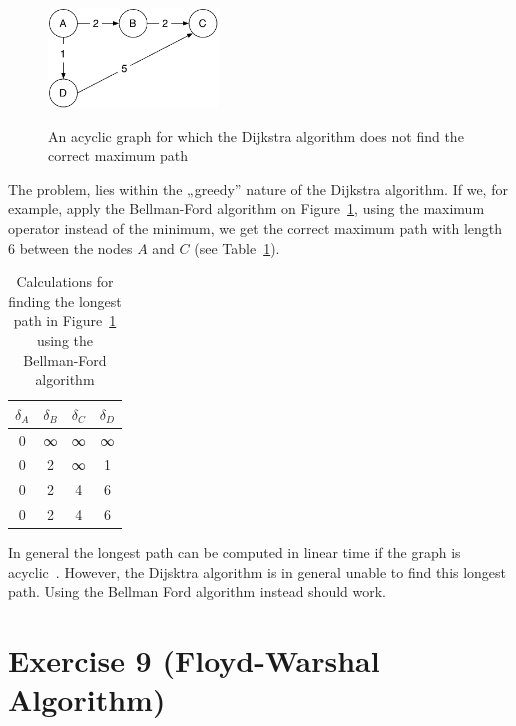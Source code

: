 \documentclass[a4paper, 12pt]{article}
\begin{document}
\begin{figure}[htbp]
    \caption{
        An acyclic graph for which the Dijkstra algorithm does not find the
        correct maximum path
    }
    \vskip 0.2cm
    \centering
    \includegraphics[width=0.4\textwidth]{Figures/Dijkstra_Counter_Example}
    \label{figure:Dijkstra_Counter_Example}
\end{figure}

The problem, lies within the „greedy” nature of the Dijkstra algorithm. If
we, for example, apply the Bellman-Ford algorithm on
Figure~\ref{figure:Dijkstra_Counter_Example}, using the maximum operator instead
of the minimum, we get the correct maximum path with length $6$ between the
nodes $A$ and $C$ (see Table~\ref{table:Bellman_Ford_Longest_Path}).\\

\begin{table}[htbp]
    \caption{
        Calculations for finding the longest path in
        Figure~\ref{figure:Dijkstra_Counter_Example} using the Bellman-Ford
        algorithm
    }
    \begin{center}
        \begin{tabular}{cccc}
            $δ_A$ & $δ_B$ & $δ_C$ & $δ_D$\\
            \hline
            0     &  ∞    &  ∞    &  ∞\\
            0     &  2    &  ∞    &  1\\
            0     &  2    &  4    &  6\\
            0     &  2    &  4    &  6\\
        \end{tabular}
    \end{center}
    \label{table:Bellman_Ford_Longest_Path}
\end{table}

In general the longest path can be computed in linear time if the graph is
acyclic~\cite{Wikipedia_Longest_Path}. However, the Dijsktra algorithm is in
general unable to find this longest path. Using the Bellman Ford
algorithm instead should work.

\section{Exercise 9 (Floyd-Warshal Algorithm)}
\end{document}
